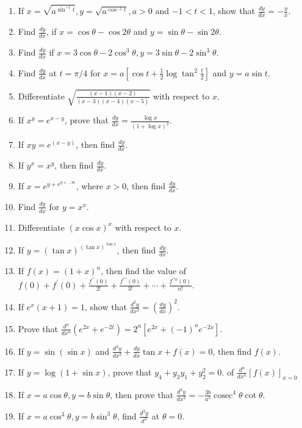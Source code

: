 \begin{enumerate}
    \item If $x=\sqrt{a^{\sin ^{-1} t}}, y=\sqrt{a^{\cos ^{-1} t}}, a>0$ and $-1<t<1$, show that $\frac{d y}{d x}=-\frac{y}{x}$.
    \item Find $\frac{d y}{d x}$, if $x=\cos \theta-\cos 2 \theta$ and $y=\sin \theta-\sin 2 \theta$.
    \item Find $\frac{d y}{d x}$ if $x=3 \cos \theta-2 \cos ^3 \theta, y=3 \sin \theta-2 \sin ^3 \theta$.
    \item Find $\frac{d y}{d x}$ at $t=\pi / 4$ for $x=a\left[\cos t+\frac{1}{2} \log \tan ^2 \frac{t}{2}\right]$ and $y=a \sin t$.
    \item Differentiate $\sqrt{\frac{(x-1)(x-2)}{(x-3)(x-4)(x-5)}}$ with respect to $x$.
    \item If $x^y=e^{x-y}$, prove that $\frac{d y}{d x}=\frac{\log x}{(1+\log x)^2}$.
    \item If $x y=e^{(x-y)}$, then find $\frac{d y}{d x}$.
    \item If $y^x=x^y$, then find $\frac{d y}{d x}$.
    \item If $x=e^{y+e^{y+\ldots \infty}}$, where $x>0$, then find $\frac{d y}{d x}$.
    \item Find $\frac{d y}{d x}$ for $y=x^x$.
    \item Differentiate $(x \cos x)^x$ with respect to $x$.
    \item If $y=(\tan x)^{(\tan x)^{\tan x}}$, then find $\frac{d y}{d x}$.
    \item If $f(x)=(1+x)^n$, then find the value of $f(0)+f^{\prime}(0)+\frac{f^{\prime \prime}(0)}{2 !}+\frac{f^{\prime \prime \prime}(0)}{3 !}+\cdots+\frac{f^{\prime \prime n}(0)}{n !}$.
    \item If $e^x(x+1)=1$, show that $\frac{d^2 y}{d x^2}=\left(\frac{d y}{d x}\right)^2$.
    \item Prove that $\frac{d^{n}}{d x^{n}}\left(e^{2 x}+e^{-2 t}\right)=2^{n}\left[e^{2 x}+(-1)^{n} e^{-2 x}\right]$.
    \item If $y=\sin (\sin x)$ and $\frac{d^2 y}{d x^2}+\frac{d y}{d x} \tan x+f(x)=0$, then find $f(x)$.
    \item If $y=\log (1+\sin x)$, prove that $y_4+y_3 y_1+y_2^2=0$. of $\frac{d^n}{d x^n}[f(x)]_{x=0}$
    \item If $x=a \cos \theta, y=b \sin \theta$, then prove that $\frac{d^3 y}{d x^3}=-\frac{3 b}{a^3} \operatorname{cosec}^4 \theta \cot \theta$.
    \item If $x=a \cos ^3 \theta, y=b \sin ^3 \theta$, find $\frac{d^3 y}{d^3}$ at $\theta=0$.
\end{enumerate}

